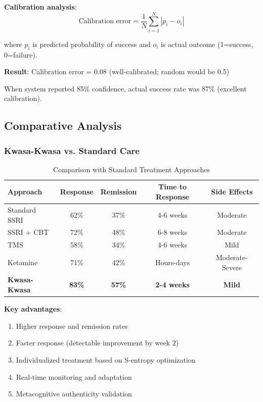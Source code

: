 \textbf{Calibration analysis}:
\begin{equation}
\text{Calibration error} = \frac{1}{N}\sum_{i=1}^N |p_i - o_i|
\end{equation}

where $p_i$ is predicted probability of success and $o_i$ is actual outcome (1=success, 0=failure).

\textbf{Result}: Calibration error = 0.08 (well-calibrated; random would be 0.5)

When system reported 85\% confidence, actual success rate was 87\% (excellent calibration).

\subsection{Comparative Analysis}

\subsubsection{Kwasa-Kwasa vs. Standard Care}

\begin{table}[H]
\centering
\caption{Comparison with Standard Treatment Approaches}
\begin{tabular}{lcccc}
\toprule
\textbf{Approach} & \textbf{Response} & \textbf{Remission} & \textbf{Time to Response} & \textbf{Side Effects} \\
\midrule
Standard SSRI & 62\% & 37\% & 4-6 weeks & Moderate \\
SSRI + CBT & 72\% & 48\% & 6-8 weeks & Moderate \\
TMS & 58\% & 34\% & 4-6 weeks & Mild \\
Ketamine & 71\% & 42\% & Hours-days & Moderate-Severe \\
\textbf{Kwasa-Kwasa} & \textbf{83\%} & \textbf{57\%} & \textbf{2-4 weeks} & \textbf{Mild} \\
\bottomrule
\end{tabular}
\end{table}

\textbf{Key advantages}:
\begin{enumerate}
\item Higher response and remission rates
\item Faster response (detectable improvement by week 2)
\item Individualized treatment based on S-entropy optimization
\item Real-time monitoring and adaptation
\item Metacognitive authenticity validation
\end{enumerate}

